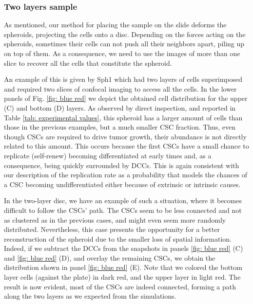 \documentclass[fleqn,10pt]{wlscirep}
\begin{document}
\subsubsection*{Two layers sample}

As mentioned, our method for placing the sample on the slide deforms  the spheroids, projecting the cells onto a disc. Depending on the forces acting on the spheroids, sometimes their cells can not push all their neighbors apart, piling up on top of them. As a consequence, we need to use the images of more than one slice to recover all the cells that constitute the spheroid. 

An example of this is given by {\textsf Sph1} which had two layers of cells superimposed and required two slices of confocal imaging to access all the cells. In the lower panels of Fig. \ref{fig: blue red} we depict the obtained cell distribution for the upper (C) and bottom (D) layers. As observed by direct inspection, and reported in Table \ref{tab: experimental values}, this spheroid has a larger amount of cells than those in the previous examples, but a much smaller CSC fraction. Thus, even though CSCs are  required to drive tumor growth, their abundance is not directly related to this  amount. This occurs because the first CSCs have a  small chance to replicate (self-renew) becoming differentiated at early times and, as a consequence, being quickly surrounded by DCCs. This is again consistent with our description of the replication rate as a probability that models the chances of a CSC becoming undifferentiated either because of extrinsic or intrinsic causes. 

In the two-layer disc, we have an example of such a situation, where it becomes difficult to follow the CSCs' path. The CSCs seem to be less connected and not as clustered as in the previous cases, and might even seem more randomly distributed. Nevertheless, this case presents the opportunity for a better reconstruction of the spheroid due to the smaller loss of spatial information.  Indeed, if we subtract the DCCs from the snapshots in panels \ref{fig: blue red} (C) and \ref{fig: blue red} (D), and overlay the remaining CSCs, we obtain the distribution shown in panel \ref{fig: blue red} (E). Note that we colored the bottom layer cells (against the plate) in dark red, and the upper layer in light red. The result is now evident, most of the CSCs are indeed connected, forming a path along the two layers as we expected from the simulations.
\end{document}
